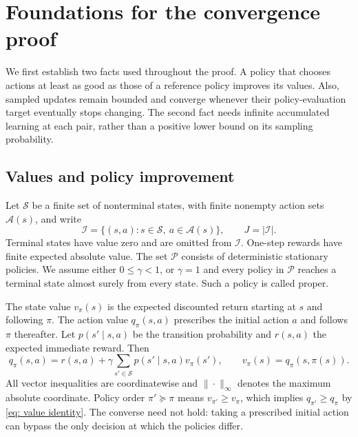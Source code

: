 \section{Foundations for the convergence proof}
\label{sec: replacement foundations}
We first establish two facts used throughout the proof. A policy that chooses actions at least as good as those of a reference policy improves its values. Also, sampled updates remain bounded and converge whenever their policy-evaluation target eventually stops changing. The second fact needs infinite accumulated learning at each pair, rather than a positive lower bound on its sampling probability.

\subsection{Values and policy improvement}
Let $\mathcal S$ be a finite set of nonterminal states, with finite nonempty action sets $\mathcal A(s)$, and write
\[
\mathcal I=\{(s,a):s\in\mathcal S,\ a\in\mathcal A(s)\},\qquad J=|\mathcal I|.
\]
Terminal states have value zero and are omitted from $\mathcal I$. One-step rewards have finite expected absolute value. The set $\mathcal P$ consists of deterministic stationary policies. We assume either $0\le\gamma<1$, or $\gamma=1$ and every policy in $\mathcal P$ reaches a terminal state almost surely from every state. Such a policy is called proper.

The state value $v_\pi(s)$ is the expected discounted return starting at $s$ and following $\pi$. The action value $q_\pi(s,a)$ prescribes the initial action $a$ and follows $\pi$ thereafter. Let $p(s'\mid s,a)$ be the transition probability and $r(s,a)$ the expected immediate reward. Then
\begin{equation}\label{eq: value identity}
q_\pi(s,a)=r(s,a)+\gamma\sum_{s'\in\mathcal S}p(s'\mid s,a)v_\pi(s'),
\qquad v_\pi(s)=q_\pi(s,\pi(s)).
\end{equation}
All vector inequalities are coordinatewise and $\|\cdot\|_\infty$ denotes the maximum absolute coordinate. Policy order $\pi'\succeq\pi$ means $v_{\pi'}\ge v_\pi$, which implies $q_{\pi'}\ge q_\pi$ by \eqref{eq: value identity}. The converse need not hold: taking a prescribed initial action can bypass the only decision at which the policies differ.

